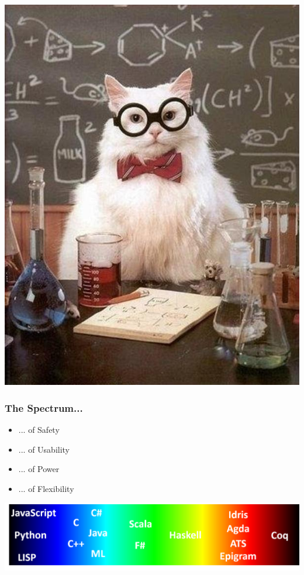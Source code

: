 \documentclass{beamer}
\begin{document}
  \begin{frame}
    \centering
    \includegraphics[scale=0.3]{science.jpg}
  \end{frame}
  
  \begin{frame}
    \frametitle{The Spectrum...}
    
    \begin{itemize}
      \item ... of Safety
      \item ... of Usability
      \item ... of Power
      \item ... of Flexibility
    \end{itemize}
    \vfill
    \centering
    \includegraphics[scale=0.3]{spectrum.png}
  \end{frame}
\end{document}
